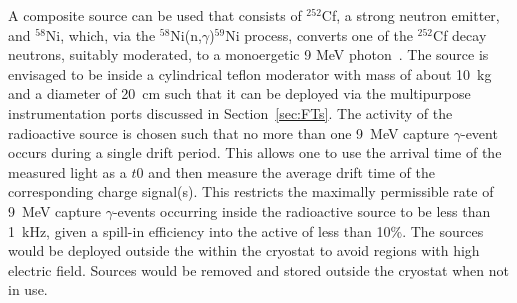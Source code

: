A composite source can be used that consists  of $^{252}$Cf, a strong neutron emitter, and $^{58}$Ni, which, via the $^{58}$Ni(n,$\gamma$)$^{59}$Ni process, converts one of the $^{252}$Cf decay neutrons, suitably moderated, to a monoergetic 9 MeV photon~\cite{Rogers:1996ks}. %
The source is envisaged to be inside a cylindrical teflon moderator with mass of about \SI{10}{kg} and a diameter of \SI{20}{\cm} such that it can be deployed via the multipurpose instrumentation ports discussed in Section~\ref{sec:FTs}. The activity of the radioactive source is chosen such that no more than one \SI{9}{\MeV} capture $\gamma$-event occurs during a single %
drift period. This allows one to use the arrival time of the measured light as a $t0$ and then measure the average drift time of the corresponding charge signal(s).
This restricts the maximally permissible rate of \SI{9}{\MeV} capture $\gamma$-events occurring inside the radioactive source to be less
than \SI{1}{\kilo\hertz}, given a spill-in efficiency into the active  of
less than \num{10}\%. 
The sources would be deployed outside the  within the cryostat to avoid regions with high electric field. Sources would be removed and stored outside the cryostat when not in use.




